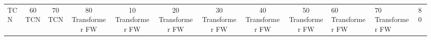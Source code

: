 \begin{table}
\begin{tabular}{|l|c|c|c|c|c|c|c|c|}
TCN & 60%
TCN & 70%
TCN & 80%
Transformer FW & 10%
Transformer FW & 20%
Transformer FW & 30%
Transformer FW & 40%
Transformer FW & 50%
Transformer FW & 60%
Transformer FW & 70%
Transformer FW & 80%
\bottomrule
\end{tabular}
\end{table}
